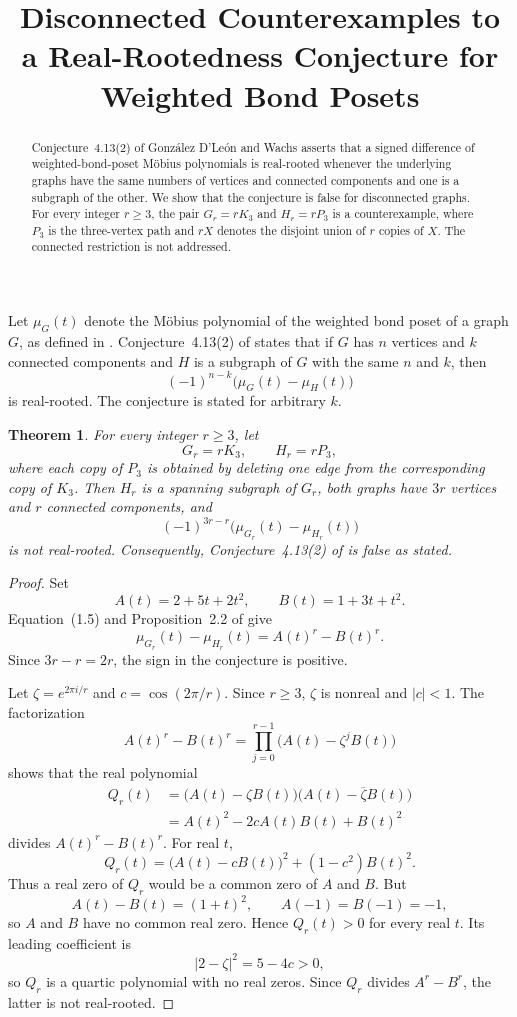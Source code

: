 \documentclass[11pt]{amsart}
\title[Disconnected counterexamples]
{Disconnected Counterexamples to a Real-Rootedness Conjecture
for Weighted Bond Posets}
\date{}
\newtheorem{theorem}{Theorem}
\theoremstyle{remark}
\begin{document}
\begin{abstract}
Conjecture~4.13(2) of Gonz\'alez D'Le\'on and Wachs
\cite{GDLW} asserts that a signed difference of weighted-bond-poset
M\"obius polynomials is real-rooted whenever the underlying graphs
have the same numbers of vertices and connected components and one
is a subgraph of the other. We show that the conjecture is false for
disconnected graphs. For every integer $r\geq 3$, the pair
$G_r=rK_3$ and $H_r=rP_3$ is a counterexample, where $P_3$ is
the three-vertex path and $rX$ denotes the disjoint union of $r$ copies
of $X$. The connected restriction is not addressed.
\end{abstract}

\maketitle

Let $\mu_G(t)$ denote the M\"obius polynomial of the weighted bond
poset of a graph $G$, as defined in \cite{GDLW}. Conjecture~4.13(2)
of \cite{GDLW} states that if $G$ has $n$ vertices and $k$ connected
components and $H$ is a subgraph of $G$ with the same $n$ and $k$,
then
\[
(-1)^{n-k}\bigl(\mu_G(t)-\mu_H(t)\bigr)
\]
is real-rooted. The conjecture is stated for arbitrary $k$.

\begin{theorem}
For every integer $r\geq 3$, let
\[
G_r=rK_3,
\qquad
H_r=rP_3,
\]
where each copy of $P_3$ is obtained by deleting one edge from the
corresponding copy of $K_3$. Then $H_r$ is a spanning subgraph of
$G_r$, both graphs have $3r$ vertices and $r$ connected components,
and
\[
(-1)^{3r-r}\bigl(\mu_{G_r}(t)-\mu_{H_r}(t)\bigr)
\]
is not real-rooted. Consequently, Conjecture~4.13(2) of
\cite{GDLW} is false as stated.
\end{theorem}

\begin{proof}
Set
\[
A(t)=2+5t+2t^2,
\qquad
B(t)=1+3t+t^2.
\]
Equation~(1.5) and Proposition~2.2 of \cite{GDLW} give
\[
\mu_{G_r}(t)-\mu_{H_r}(t)=A(t)^r-B(t)^r.
\]
Since $3r-r=2r$, the sign in the conjecture is positive.

Let $\zeta=e^{2\pi i/r}$ and $c=\cos(2\pi/r)$. Since $r\geq3$,
$\zeta$ is nonreal and $|c|<1$. The factorization
\[
A(t)^r-B(t)^r
=\prod_{j=0}^{r-1}\bigl(A(t)-\zeta^jB(t)\bigr)
\]
shows that the real polynomial
\[
\begin{aligned}
Q_r(t)
&=\bigl(A(t)-\zeta B(t)\bigr)
  \bigl(A(t)-\overline{\zeta}B(t)\bigr)\\
&=A(t)^2-2cA(t)B(t)+B(t)^2
\end{aligned}
\]
divides $A(t)^r-B(t)^r$. For real $t$,
\[
Q_r(t)
=\bigl(A(t)-cB(t)\bigr)^2+(1-c^2)B(t)^2.
\]
Thus a real zero of $Q_r$ would be a common zero of $A$ and $B$.
But
\[
A(t)-B(t)=(1+t)^2,
\qquad
A(-1)=B(-1)=-1,
\]
so $A$ and $B$ have no common real zero. Hence $Q_r(t)>0$ for every
real $t$. Its leading coefficient is
\[
|2-\zeta|^2=5-4c>0,
\]
so $Q_r$ is a quartic polynomial with no real zeros. Since $Q_r$
divides $A^r-B^r$, the latter is not real-rooted.
\end{proof}
\end{document}
